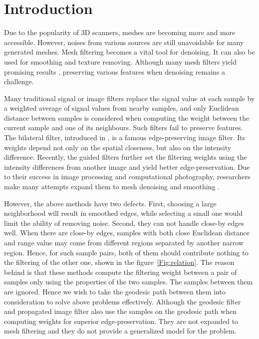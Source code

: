 \section{Introduction}


Due to the popularity of 3D scanners, meshes are becoming more and more accessible. However, noises from various sources are still unavoidable for many generated meshes.
Mesh filtering becomes a vital tool for denoising. It can also be used for smoothing and texture removing.
Although many mesh filters yield promising results \cite{jones2003non, zheng2011bilateral, he2013mesh, Zhang2015Filter, Wang2015rolling}, preserving various features when denoising remains a challenge.

Many traditional signal or image filters replace the signal value at each sample by a weighted average of signal values from nearby samples, and only Euclidean distance between samples is considered when computing the weight between the current sample and one of its neighbours. Such filters fail to preserve features.
The bilateral filter, introduced in \cite{tomasi1998bilateral}, is a famous edge-preserving image filter. Its weights depend not only on the spatial closeness, but also on the intensity difference.
Recently, the guided filters \cite{Petschnigg2004, he2010guided} further set the filtering weights using the intensity differences from another image and yield better edge-preservation.
Due to their success in image processing and computational photography,
researchers make many attempts expand them to mesh denoising and smoothing \cite{jones2003non, zheng2011bilateral, Solomon2014general, Zhang2015Filter}.

However, the above methods have two defects. First, choosing a large neighborhood will result in smoothed edges, while selecting a small one would limit the ability of removing noise.
Second, they can not handle close-by edges well. When there are close-by edges, samples with both close Euclidean distance and range value may come from different regions separated by another narrow region. Hence, for such sample pairs, both of them should contribute nothing to the filtering of the other one, shown in the figure~\ref{Fig:relation}.
The reason behind is that these methods compute the filtering weight between a pair of samples only using the properties of the two samples. The samples between them are ignored. Hence we wish to take the geodesic path between them into consideration to solve above problems effectively.
Although the geodesic filter~\cite{grazzini2009edge} and propagated image filter \cite{Chang2015propagated} also use the samples on the geodesic path when computing weights for superior edge-preservation. They are not expanded to mesh filtering and they do not provide a generalized model for the problem.

